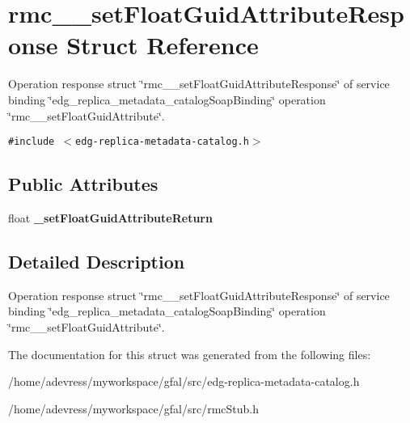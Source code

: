\section{rmc\_\-\_\-set\-Float\-Guid\-Attribute\-Response Struct Reference}
\label{structrmc____setFloatGuidAttributeResponse}
Operation response struct \char`\"{}rmc\_\-\_\-set\-Float\-Guid\-Attribute\-Response\char`\"{} of service binding \char`\"{}edg\_\-replica\_\-metadata\_\-catalog\-Soap\-Binding\char`\"{} operation \char`\"{}rmc\_\-\_\-set\-Float\-Guid\-Attribute\char`\"{}.  


{\tt \#include $<$edg-replica-metadata-catalog.h$>$}

\subsection*{Public Attributes}
\begin{CompactItemize}
\item 
float \textbf{\_\-set\-Float\-Guid\-Attribute\-Return}\label{structrmc____setFloatGuidAttributeResponse_1b709c4f83c0ceea728f05957590735d}

\end{CompactItemize}


\subsection{Detailed Description}
Operation response struct \char`\"{}rmc\_\-\_\-set\-Float\-Guid\-Attribute\-Response\char`\"{} of service binding \char`\"{}edg\_\-replica\_\-metadata\_\-catalog\-Soap\-Binding\char`\"{} operation \char`\"{}rmc\_\-\_\-set\-Float\-Guid\-Attribute\char`\"{}. 



The documentation for this struct was generated from the following files:\begin{CompactItemize}
\item 
/home/adevress/myworkspace/gfal/src/edg-replica-metadata-catalog.h\item 
/home/adevress/myworkspace/gfal/src/rmc\-Stub.h\end{CompactItemize}
